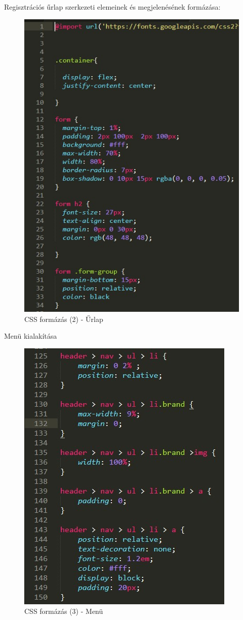 \documentclass[12pt, titlepage]{article}
\begin{document}
Regisztrációs űrlap szerkezeti elemeinek és megjelenésének formázása:
\begin{figure}[!h]
	\centering
	\includegraphics[width=0.8\linewidth]{images/css/2.jpg}
	\caption{CSS formázás (2) - Űrlap}
\end{figure}

\pagebreak

Menü kialakítása
\begin{figure}[!h]
	\centering
	\includegraphics[width=0.8\linewidth]{images/css/3.jpg}
	\caption{CSS formázás (3) - Menü}
\end{figure}
\end{document}
